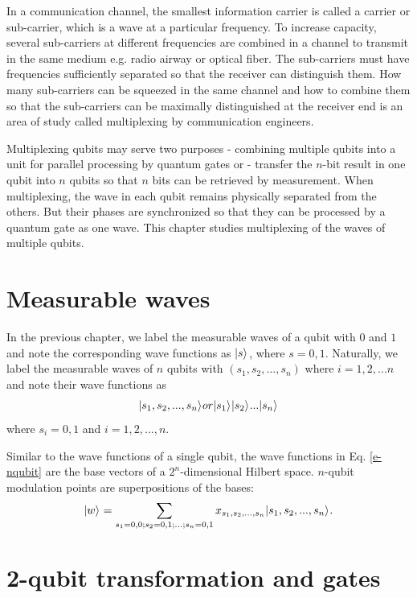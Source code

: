 \documentclass[oneside, letter, 12pt]{book}
\begin{document}
In a communication channel, the smallest information carrier is called a carrier or sub-carrier, which is a wave at a particular frequency. To increase capacity, several sub-carriers at different frequencies are combined in a channel to transmit in the same medium e.g. radio airway or optical fiber. The sub-carriers must have frequencies sufficiently separated so that the receiver can distinguish them. How many sub-carriers can be squeezed in the same channel and how to combine them so that the sub-carriers can be maximally distinguished at the receiver end is an area of study called multiplexing by communication engineers.

Multiplexing qubits may serve two purposes
- combining multiple qubits into a unit for parallel processing by quantum gates or
- transfer the $n$-bit result in one qubit into $n$ qubits so that $n$ bits can be retrieved by measurement.
When multiplexing, the wave in each qubit remains physically separated from the others. But their phases are synchronized so that they can be processed by a quantum gate as one wave. This chapter studies multiplexing of the waves of multiple qubits.

\section{Measurable waves}
In the previous chapter, we label the measurable waves of a qubit with $0$ and $1$ and note the corresponding wave functions as $\vert {s} \rangle_{}$, where $s=0, 1$. Naturally, we label the measurable waves of $n$ qubits with $(s_1, s_2, ..., s_n)$ where $i=1, 2, ...n$ and note their wave functions as
\begin{equation}\label{e-nqubit}
    \vert {s_1, s_2, ..., s_n} \rangle_{} or
    \vert {s_1} \rangle_{} \vert {s_2} \rangle_{} ... \vert {s_n} \rangle_{}
\end{equation}
where $s_i = 0, 1$ and $i=1, 2, ..., n$.

Similar to the wave functions of a single qubit, the wave functions in Eq. \ref{e-nqubit} are the base vectors of a $2^n$-dimensional Hilbert space. $n$-qubit modulation points are superpositions of the bases:
\begin{equation}
    \vert {w} \rangle_{} = \sum_{s_1=0,0; s_2=0,1; ...; s_n=0,1} x_{s_1, s_2, ..., s_n} \vert {s_1, s_2, ..., s_n} \rangle_{}.
\end{equation}

\section{2-qubit transformation and gates}
\end{document}
